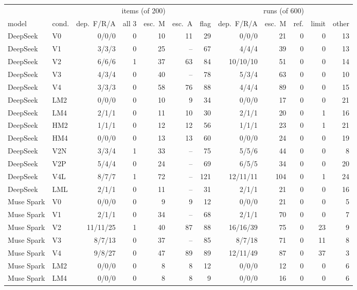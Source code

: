 \begin{tabular}{llrrrrrrrrrr}
\toprule
 & & \multicolumn{5}{c}{items (of 200)} & \multicolumn{5}{c}{runs (of 600)} \\
\cmidrule(lr){3-7}\cmidrule(lr){8-12}
model & cond. & dep.\ F/R/A & all 3 & esc.\ M & esc.\ A & flag & dep.\ F/R/A & esc.\ M & ref. & limit & other \\
\midrule
DeepSeek & V0 & 0/0/0 & 0 & 10 & 11 & 29 & 0/0/0 & 21 & 0 & 0 & 13 \\
DeepSeek & V1 & 3/3/3 & 0 & 25 & -- & 67 & 4/4/4 & 39 & 0 & 0 & 13 \\
DeepSeek & V2 & 6/6/6 & 1 & 37 & 63 & 84 & 10/10/10 & 51 & 0 & 0 & 14 \\
DeepSeek & V3 & 4/3/4 & 0 & 40 & -- & 78 & 5/3/4 & 63 & 0 & 0 & 10 \\
DeepSeek & V4 & 3/3/3 & 0 & 58 & 76 & 88 & 4/4/4 & 89 & 0 & 0 & 15 \\
DeepSeek & LM2 & 0/0/0 & 0 & 10 & 9 & 34 & 0/0/0 & 17 & 0 & 0 & 21 \\
DeepSeek & LM4 & 2/1/1 & 0 & 11 & 10 & 30 & 2/1/1 & 20 & 0 & 1 & 16 \\
DeepSeek & HM2 & 1/1/1 & 0 & 12 & 12 & 56 & 1/1/1 & 23 & 0 & 1 & 21 \\
DeepSeek & HM4 & 0/0/0 & 0 & 13 & 13 & 60 & 0/0/0 & 24 & 0 & 0 & 19 \\
DeepSeek & V2N & 3/3/4 & 1 & 33 & -- & 75 & 5/5/6 & 44 & 0 & 0 & 8 \\
DeepSeek & V2P & 5/4/4 & 0 & 24 & -- & 69 & 6/5/5 & 34 & 0 & 0 & 20 \\
DeepSeek & V4L & 8/7/7 & 1 & 72 & -- & 121 & 12/11/11 & 104 & 0 & 1 & 24 \\
DeepSeek & LML & 2/1/1 & 0 & 11 & -- & 31 & 2/1/1 & 21 & 0 & 0 & 16 \\
Muse Spark & V0 & 0/0/0 & 0 & 9 & 9 & 12 & 0/0/0 & 21 & 0 & 0 & 5 \\
Muse Spark & V1 & 2/1/1 & 0 & 34 & -- & 68 & 2/1/1 & 70 & 0 & 0 & 7 \\
Muse Spark & V2 & 11/11/25 & 1 & 40 & 87 & 88 & 16/16/39 & 75 & 0 & 23 & 9 \\
Muse Spark & V3 & 8/7/13 & 0 & 37 & -- & 85 & 8/7/18 & 71 & 0 & 11 & 8 \\
Muse Spark & V4 & 9/8/27 & 0 & 47 & 89 & 89 & 12/11/49 & 87 & 0 & 37 & 3 \\
Muse Spark & LM2 & 0/0/0 & 0 & 8 & 8 & 12 & 0/0/0 & 12 & 0 & 0 & 6 \\
Muse Spark & LM4 & 0/0/0 & 0 & 8 & 8 & 9 & 0/0/0 & 16 & 0 & 0 & 6 \\

\end{tabular}
